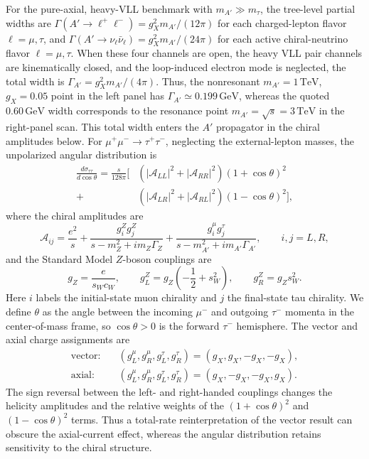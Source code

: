 \documentclass[12pt,a4paper]{article}
\begin{document}
For the pure-axial, heavy-VLL benchmark with \(m_{A'}\gg m_\tau\), the tree-level partial widths are \(\Gamma(A'\to\ell^+\ell^-)=g_X^2m_{A'}/(12\pi)\) for each charged-lepton flavor \(\ell=\mu,\tau\), and \(\Gamma(A'\to\nu_\ell\bar\nu_\ell)=g_X^2m_{A'}/(24\pi)\) for each active chiral-neutrino flavor \(\ell=\mu,\tau\). When these four channels are open, the heavy VLL pair channels are kinematically closed, and the loop-induced electron mode is neglected, the total width is \(\Gamma_{A'}=g_X^2m_{A'}/(4\pi)\). Thus, the nonresonant \(m_{A'}=1\,\mathrm{TeV}\), \(g_X=0.05\) point in the left panel has \(\Gamma_{A'}\simeq0.199\,\mathrm{GeV}\), whereas the quoted \(0.60\,\mathrm{GeV}\) width corresponds to the resonance point \(m_{A'}=\sqrt{s}=3\,\mathrm{TeV}\) in the right-panel scan. This total width enters the \(A'\) propagator in the chiral amplitudes below. For \(\mu^+\mu^-\to\tau^+\tau^-\), neglecting the external-lepton masses, the unpolarized angular distribution is
\[
\begin{aligned}
\frac{d\sigma_{\tau\tau}}{d\cos\theta}
=\frac{s}{128\pi}\Big[&
\left(|\mathcal A_{LL}|^2+|\mathcal A_{RR}|^2\right)(1+\cos\theta)^2\\
+{}&\left(|\mathcal A_{LR}|^2+|\mathcal A_{RL}|^2\right)(1-\cos\theta)^2\Big],
\end{aligned}
\]
where the chiral amplitudes are
\[
\mathcal A_{ij}
=
\frac{e^2}{s}
+\frac{g_i^Zg_j^Z}{s-m_Z^2+i m_Z\Gamma_Z}
+\frac{g_i^\mu g_j^\tau}{s-m_{A'}^2+i m_{A'}\Gamma_{A'}},
\qquad i,j=L,R,
\]
and the Standard Model \(Z\)-boson couplings are
\[
g_Z=\frac{e}{s_Wc_W},\qquad
g_L^Z=g_Z\left(-\frac12+s_W^2\right),\qquad
g_R^Z=g_Zs_W^2.
\]
Here \(i\) labels the initial-state muon chirality and \(j\) the final-state tau chirality. We define \(\theta\) as the angle between the incoming \(\mu^-\) and outgoing \(\tau^-\) momenta in the center-of-mass frame, so \(\cos\theta>0\) is the forward \(\tau^-\) hemisphere.
The vector and axial charge assignments are
\[
\begin{aligned}
\text{vector:}\quad&
(g_L^\mu,g_R^\mu,g_L^\tau,g_R^\tau)
=(g_X,g_X,-g_X,-g_X),\\
\text{axial:}\quad&
(g_L^\mu,g_R^\mu,g_L^\tau,g_R^\tau)
=(g_X,-g_X,-g_X,g_X).
\end{aligned}
\]
The sign reversal between the left- and right-handed couplings changes the helicity amplitudes and the relative weights of the \((1+\cos\theta)^2\) and \((1-\cos\theta)^2\) terms. Thus a total-rate reinterpretation of the vector result can obscure the axial-current effect, whereas the angular distribution retains sensitivity to the chiral structure.
\end{document}
